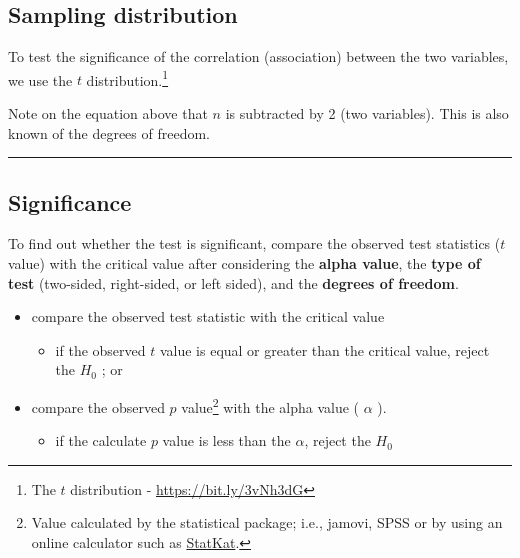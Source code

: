 \documentclass[
]{article}
\providecommand{\tightlist}{%
  \setlength{\itemsep}{0pt}\setlength{\parskip}{0pt}}
\begin{document}
\hypertarget{sampling-distribution}{%
\subsection{Sampling distribution}\label{sampling-distribution}}

To test the significance of the correlation (association) between the two variables, we use the \(t\) distribution.\footnote{The \(t\) distribution - \url{https://bit.ly/3vNh3dG}}

Note on the equation above that \(n\) is subtracted by 2 (two variables). This is also known of the degrees of freedom.

\begin{center}\rule{0.5\linewidth}{0.5pt}\end{center}

\hypertarget{significance}{%
\subsection{Significance}\label{significance}}

To find out whether the test is significant, compare the observed test statistics (\(t\) value) with the critical value after considering the \textbf{alpha value}, the \textbf{type of test} (two-sided, right-sided, or left sided), and the \textbf{degrees of freedom}.

\begin{itemize}
\item
  compare the observed test statistic with the critical value

  \begin{itemize}
  \tightlist
  \item
    if the observed \(t\) value is equal or greater than the critical value, reject the \(H_0\) ; or
  \end{itemize}
\item
  compare the observed \(p\) value\footnote{Value calculated by the statistical package; i.e., jamovi, SPSS or by using an online calculator such as \href{https://statkat.com/online-calculators/critical-f-value-given-alpha.php}{StatKat}.} with the alpha value ( \(\alpha\) ).

  \begin{itemize}
  \tightlist
  \item
    if the calculate \(p\) value is less than the \(\alpha\), reject the \(H_0\)
  \end{itemize}
\end{itemize}
\end{document}
